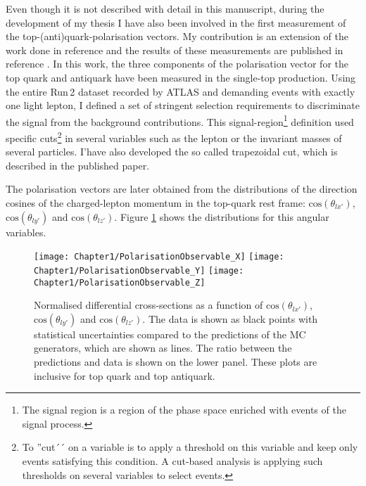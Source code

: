 Even though it is not described with detail in this manuscript, during the development 
of my thesis I have also been involved in the first measurement of the top-(anti)quark-polarisation vectors. 
My contribution is an extension of the work done in reference \cite{Martinez-Agullo:2017lty} and the results of these measurements
are published in reference \cite{ATLAS:2022vym}. In this work, the three components of the polarisation 
vector for the top quark and antiquark have been measured in the single-top \tchannel production. Using the 
entire Run$\,$2 dataset recorded by ATLAS and demanding events with exactly one light lepton,
I defined a set of stringent selection requirements to discriminate the \tchannel signal 
from the background contributions.  This signal-region\footnote{The signal region is a 
region of the phase space enriched with events of the signal process.}
definition used specific cuts\footnote{To ''cut´´ on a variable is to apply a threshold on this variable and
keep only events satisfying this condition. A cut-based analysis is
applying such thresholds on several variables to select events.}
 in several variables such as the lepton \pt or the invariant masses of several particles.
I'have also developed the so called trapezoidal cut, which is described in the published paper. 

The polarisation vectors are later obtained from the distributions 
of the direction cosines of the charged-lepton momentum in the top-quark rest frame:
$\text{cos}(\theta_{lx'})$, $\text{cos}(\theta_{ly'})$ and $\text{cos}(\theta_{lz'})$. 
Figure \ref{fig:Chap1:Polarisation:Observables} shows the distributions for this angular 
variables.

\begin{figure}[htp]
\centering
	\texttt{[image: Chapter1/PolarisationObservable\_X]}\hfill
	\texttt{[image: Chapter1/PolarisationObservable\_Y]}\hfill
	\texttt{[image: Chapter1/PolarisationObservable\_Z]}
	\caption{Normalised differential cross-sections as a function of 
	$\text{cos}(\theta_{lx'})$, $\text{cos}(\theta_{ly'})$ and $\text{cos}(\theta_{lz'})$. 
	The data is shown as black points with statistical uncertainties compared to the 
	predictions of the MC generators, which are shown as lines. The ratio between the
	predictions and data is shown on the lower panel. 
	These plots are inclusive for top quark and top antiquark.} 
	\label{fig:Chap1:Polarisation:Observables}
\end{figure}

